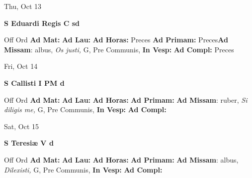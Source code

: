 \documentclass[10pt]{memoir}
\begin{document}
\begin{center}
\begin{minipage}{3.5in}
\vspace{2em}
\begin{center}Thu, Oct 13
\end{center}
\textbf{ \large S Eduardi Regis C
\textnormal{\normalsize sd}}

\begin{justify}Off Ord
\textbf{Ad Mat: }
\textbf{Ad Lau: }
\textbf{Ad Horas: }Preces
\textbf{Ad Primam: }Preces\textbf{Ad Missam}: albus, \textit{Os justi,} G, Pre Communis, 
\textbf{In Vesp: }
\textbf{Ad Compl: }Preces
\end{justify}
\end{minipage}
\end{center}

\begin{center}
\begin{minipage}{3.5in}
\vspace{2em}
\begin{center}Fri, Oct 14
\end{center}
\textbf{ \large S Callisti I PM
\textnormal{\normalsize d}}

\begin{justify}Off Ord
\textbf{Ad Mat: }
\textbf{Ad Lau: }
\textbf{Ad Horas: }
\textbf{Ad Primam: }\textbf{Ad Missam}: ruber, \textit{Si diligis me,} G, Pre Communis, 
\textbf{In Vesp: }
\textbf{Ad Compl: }
\end{justify}
\end{minipage}
\end{center}

\begin{center}
\begin{minipage}{3.5in}
\vspace{2em}
\begin{center}Sat, Oct 15
\end{center}
\textbf{ \large S Teresiæ V
\textnormal{\normalsize d}}

\begin{justify}Off Ord
\textbf{Ad Mat: }
\textbf{Ad Lau: }
\textbf{Ad Horas: }
\textbf{Ad Primam: }\textbf{Ad Missam}: albus, \textit{Dilexisti,} G, Pre Communis, 
\textbf{In Vesp: }
\textbf{Ad Compl: }
\end{justify}
\end{minipage}
\end{center}
\end{document}
